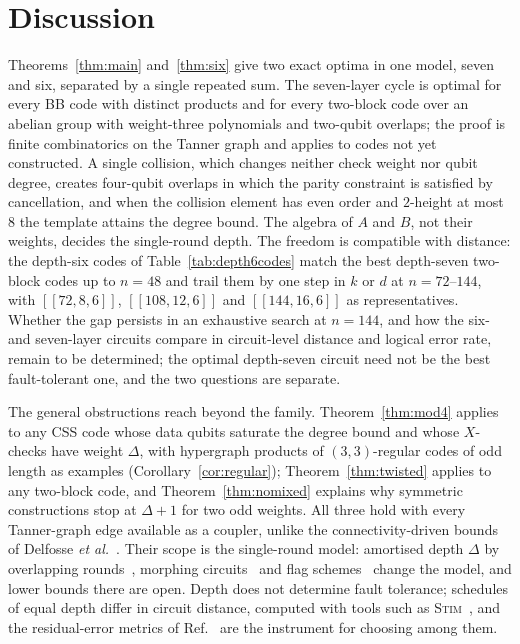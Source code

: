 \documentclass[reprint,twocolumn,superscriptaddress,nofootinbib]{revtex4-2}
\theoremstyle{plain}
\begin{document}
\section{Discussion}
\label{sec:discussion}

Theorems~\ref{thm:main} and~\ref{thm:six} give two exact optima in one
model, seven and six, separated by a single repeated sum. The seven-layer
cycle is optimal for every BB code with distinct products and for every
two-block code over an abelian group with weight-three polynomials and
two-qubit overlaps; the proof is finite combinatorics on the Tanner graph
and applies to codes not yet constructed. A single collision, which changes
neither check weight nor qubit degree, creates four-qubit overlaps in which
the parity constraint is satisfied by cancellation, and when the collision
element has even order and $2$-height at most $8$ the template attains the
degree bound. The algebra of $A$ and $B$, not their weights, decides the
single-round depth. The freedom is compatible with distance: the depth-six
codes of Table~\ref{tab:depth6codes} match the best depth-seven two-block
codes up to $n=48$ and trail them by one step in $k$ or $d$ at
$n=72$--$144$, with $[[72,8,6]]$, $[[108,12,6]]$ and $[[144,16,6]]$ as
representatives. Whether the gap persists in an exhaustive search at
$n=144$, and how the six- and seven-layer circuits compare in circuit-level
distance and logical error rate, remain to be determined; the optimal
depth-seven circuit need not be the best fault-tolerant one, and the two
questions are separate.

The general obstructions reach beyond the family. Theorem~\ref{thm:mod4}
applies to any CSS code whose data qubits saturate the degree bound and
whose $X$-checks have weight $\Delta$, with hypergraph products of
$(3,3)$-regular codes of odd length as examples
(Corollary~\ref{cor:regular}); Theorem~\ref{thm:twisted} applies to any
two-block code, and Theorem~\ref{thm:nomixed} explains why symmetric
constructions stop at $\Delta+1$ for two odd weights. All three hold with
every Tanner-graph edge available as a coupler, unlike the
connectivity-driven bounds of Delfosse \emph{et al.}~\cite{Delfosse2021}.
Their scope is the single-round model: amortised depth $\Delta$ by
overlapping rounds~\cite{Strikis2026,Yoder2025}, morphing
circuits~\cite{ShawTerhal2025,ShawTerhal2026} and flag
schemes~\cite{ChamberlandBeverland2018,ChaoReichardt2018} change the
model, and lower bounds there are open. Depth does not determine fault
tolerance; schedules of equal depth differ in circuit distance, computed
with tools such as \textsc{Stim}~\cite{Gidney2021}, and the residual-error
metrics of Ref.~\cite{Strikis2026} are the instrument for choosing among
them.
\end{document}
